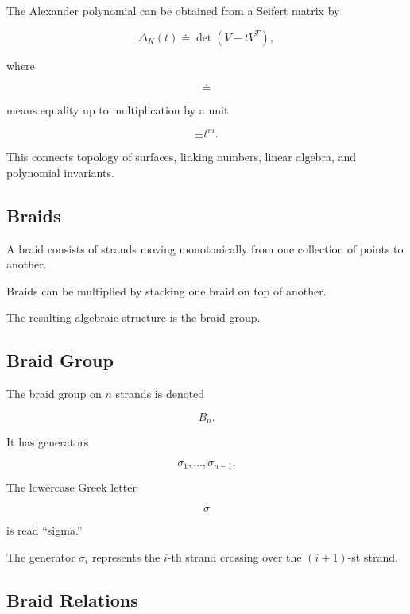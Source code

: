 The Alexander polynomial can be obtained from a Seifert matrix by

\[
\boxed{
\Delta_K(t)
\doteq
\det(V-tV^{T}),
}
\]

where

\[
\doteq
\]

means equality up to multiplication by a unit

\[
\pm t^m.
\]

This connects topology of surfaces, linking numbers, linear algebra, and
polynomial invariants.

\subsection{Braids}
\label{subsec:braids-knot-theory}

A braid consists of strands moving monotonically from one collection of
points to another.

Braids can be multiplied by stacking one braid on top of another.

The resulting algebraic structure is the braid group.

\subsection{Braid Group}
\label{subsec:braid-group}

The braid group on \(n\) strands is denoted

\[
\boxed{
B_n.
}
\]

It has generators

\[
\boxed{
\sigma_1,\ldots,\sigma_{n-1}.
}
\]

The lowercase Greek letter

\[
\sigma
\]

is read ``sigma.''

The generator \(\sigma_i\) represents the \(i\)-th strand crossing over the
\((i+1)\)-st strand.

\subsection{Braid Relations}
\label{subsec:braid-relations}

